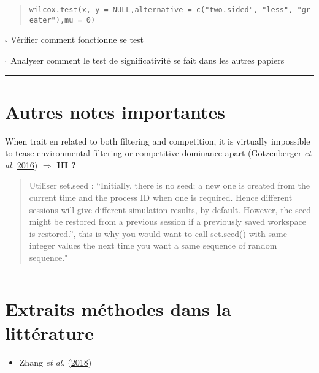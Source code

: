 \documentclass[]{article}
\providecommand{\tightlist}{%
  \setlength{\itemsep}{0pt}\setlength{\parskip}{0pt}}
\begin{document}
\begin{quote}
\texttt{wilcox.test(x,\ y\ =\ NULL,alternative\ =\ c("two.sided",\ "less",\ "greater"),mu\ =\ 0)}
\end{quote}

\(\square\) Vérifier comment fonctionne se test

\(\square\) Analyser comment le test de significativité se fait dans les
autres papiers

\begin{center}\rule{0.5\linewidth}{\linethickness}\end{center}

\section{\texorpdfstring{ \textbf{Autres notes importantes}
}{ Autres notes importantes }}\label{autres-notes-importantes}

When trait en related to both filtering and competition, it is virtually
impossible to tease environmental filtering or competitive dominance
apart (Götzenberger \emph{et al.}
\protect\hyperlink{ref-gotzenberger2016randomizations}{2016})
\(\Rightarrow\) \textbf{HI ?}

\begin{quote}
Utiliser set.seed : ``Initially, there is no seed; a new one is created
from the current time and the process ID when one is required. Hence
different sessions will give different simulation results, by default.
However, the seed might be restored from a previous session if a
previously saved workspace is restored.'', this is why you would want to
call set.seed() with same integer values the next time you want a same
sequence of random sequence."
\end{quote}

\begin{center}\rule{0.5\linewidth}{\linethickness}\end{center}

\section{\texorpdfstring{ \textbf{Extraits méthodes dans la littérature}
}{ Extraits méthodes dans la littérature }}\label{exemples}

\begin{itemize}
\tightlist
\item
  Zhang \emph{et al.} (\protect\hyperlink{ref-zhang2018}{2018})
\end{itemize}
\end{document}
